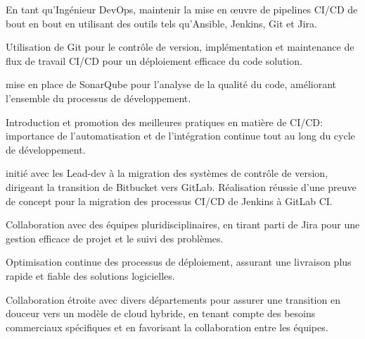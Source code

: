 \begin{cventries}
{\begin{cvitems}
        \item {En tant qu'Ingénieur DevOps, maintenir la mise en œuvre de pipelines CI/CD de bout en bout en utilisant des outils tels qu'Ansible, Jenkins, Git et Jira.}
        \item {Utilisation de Git pour le contrôle de version, implémentation et maintenance de flux de travail CI/CD pour un déploiement efficace du code solution.}
        \item {mise en place  de SonarQube pour l'analyse de la qualité du code, améliorant l'ensemble du processus de développement.}
        \item {Introduction et promotion des meilleures pratiques en matière de CI/CD: importance de l'automatisation et de l'intégration continue tout au long du cycle de développement.}
        \item {initié avec les Lead-dev à la migration des systèmes de contrôle de version, dirigeant la transition de Bitbucket vers GitLab. Réalisation réussie d'une preuve de concept pour la migration des processus CI/CD de Jenkins à GitLab CI.}
        \item {Collaboration avec des équipes pluridisciplinaires, en tirant parti de Jira pour une gestion efficace de projet et le suivi des problèmes.}
        \item {Optimisation continue des processus de déploiement, assurant une livraison plus rapide et fiable des solutions logicielles.}
        \item {Collaboration étroite avec divers départements pour assurer une transition en douceur vers un modèle de cloud hybride, en tenant compte des besoins commerciaux spécifiques et en favorisant la collaboration entre les équipes.}
      \end{cvitems}
        
    }


\end{cventries}
